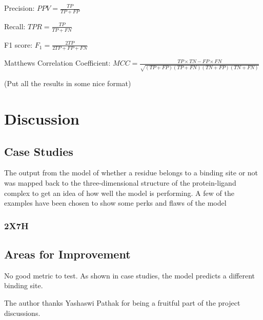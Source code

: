 \documentclass[journal=jacsat,manuscript=article]{achemso}
\begin{document}
Precision: ${PPV} = \frac{TP}{TP + FP}$

Recall: ${TPR} = \frac{TP}{TP + FN}$

F1 score: ${F_1} = \frac{2TP}{2TP + FP + FN}$

Matthews Correlation Coefficient: ${MCC} = \frac{TP \times TN - FP \times FN}{\sqrt{(TP + FP)(TP + FN)(TN + FP)(TN + FN)}}$

(Put all the results in some nice format)









\section{Discussion}
\quad

\subsection{Case Studies}
The output from the model of whether a residue belongs to a binding site or not was mapped back to the three-dimensional structure of the protein-ligand complex to get an idea of how well the model is performing. A few of the examples have been chosen to show some perks and flaws of the model
\subsubsection{2X7H}

\subsection{Areas for Improvement}
\quad No good metric to test. As shown in case studies, the model predicts a different binding site.

\begin{acknowledgement}
    The author thanks Yashaswi Pathak for being a fruitful part of the project discussions.

\end{acknowledgement}
\end{document}
